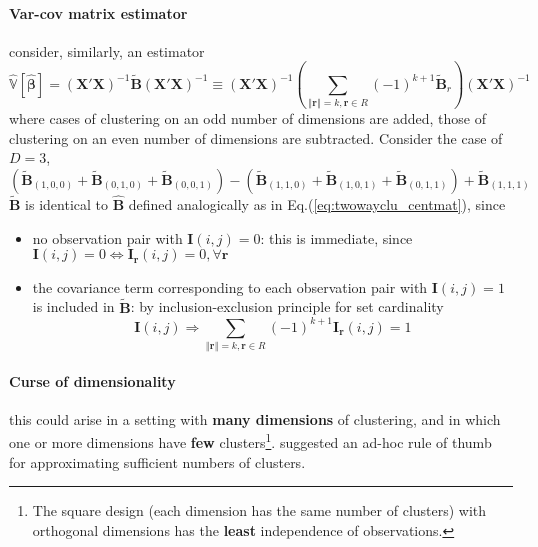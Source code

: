 \documentclass[twoside]{article}
\begin{document}
\paragraph*{Var-cov matrix estimator} consider, similarly, an estimator 
\begin{equation}
    \hat{\mathbb{V}}\left[\hat{\boldsymbol{\beta}}\right] = \left(\mathbf{X'X}\right)^{-1}\tilde{\mathbf{B}} \left(\mathbf{X'X}\right)^{-1} \equiv  \left(\mathbf{X'X}\right)^{-1}  \left(\sum_{\left\Vert \mathbf{r} \right\Vert =k,\mathbf{r}\in R} (-1)^{k+1}\tilde{\mathbf{B}}_r \right)  \left(\mathbf{X'X}\right)^{-1}
\end{equation}
where cases of clustering on an odd number of dimensions are added, those of clustering on an even number of dimensions are subtracted. Consider the case of $D=3$,
\begin{equation*}
    \left(\tilde{\mathbf{B}}_{(1,0,0)} + \tilde{\mathbf{B}}_{(0,1,0)} + \tilde{\mathbf{B}}_{(0,0,1)} \right) - \left( \tilde{\mathbf{B}}_{(1,1,0)} + \tilde{\mathbf{B}}_{(1,0,1)} + \tilde{\mathbf{B}}_{(0,1,1)} \right) + \tilde{\mathbf{B}}_{(1,1,1)}
\end{equation*}
$\tilde{\mathbf{B}}$ is identical to $\hat{\mathbf{B}}$ defined analogically as in Eq.(\ref{eq:twowayclu_centmat}), since 
\begin{itemize}
    \item no observation pair with $\mathbf{I}(i,j)=0$: this is immediate, since $\mathbf{I}(i,j)=0 \Leftrightarrow \mathbf{I_r}(i,j)=0,\forall \mathbf{r}$
    \item the covariance term corresponding to each observation pair with $\mathbf{I}(i,j)=1$ is included  in $\tilde{\mathbf{B}} $: by inclusion-exclusion principle for set cardinality
    $$\mathbf{I}(i,j) \Rightarrow \sum_{\left\Vert \mathbf{r} \right\Vert=k,\mathbf{r}\in R}(-1)^{k+1}\mathbf{I_r}(i,j)=1 $$
\end{itemize} 

\paragraph*{Curse of dimensionality} this could arise in a setting with \textbf{many dimensions} of clustering, and in which one or more dimensions have \textbf{few} clusters\footnote{The square design (each dimension has the same number of clusters) with orthogonal dimensions has the \textbf{least} independence of observations.}.
\citet{cameron2011robust} suggested an ad-hoc rule of thumb for approximating sufficient numbers of clusters.
\end{document}
